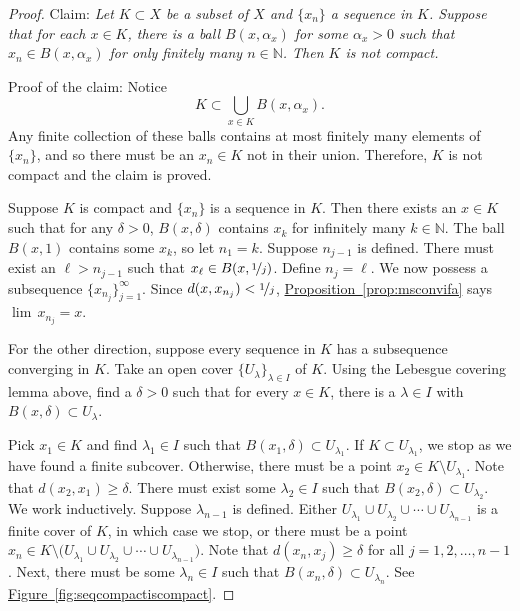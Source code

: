 \documentclass[12pt,openany]{book}
\newcommand{\N}{{\mathbb{N}}}
\theoremstyle{plain}
\theoremstyle{remark}
\theoremstyle{definition}
\theoremstyle{exercise}
\theoremstyle{example}
\newcommand{\figureref}[1]{\hyperref[#1]{Figure~\ref*{#1}}}
\newcommand{\propref}[1]{\hyperref[#1]{Proposition~\ref*{#1}}}
\begin{document}
\begin{proof}
Claim: \emph{Let $K \subset X$ be a subset of $X$ and
$\{ x_n \}$ a sequence in $K$.  Suppose that for each $x \in K$,
there is a ball $B(x,\alpha_x)$ for some $\alpha_x > 0$ such that
$x_n \in B(x,\alpha_x)$ for only finitely many $n \in \N$.
Then $K$ is not compact.}

Proof of the claim:
Notice
\begin{equation*}
K \subset \bigcup_{x \in K} B(x,\alpha_x) .
\end{equation*}
Any finite collection of these balls contains at most finitely many
elements of $\{ x_n \}$,
and so there must be an $x_n \in K$
not in their union.  Therefore, $K$ is not compact and the claim is
proved.

Suppose $K$ is compact and $\{ x_n \}$ is a sequence in $K$.
Then there exists an $x \in K$ such that
for any $\delta > 0$,
$B(x,\delta)$ contains $x_k$ for infinitely many $k \in \N$.
The ball $B(x,1)$ contains some $x_k$, so let $n_1 = k$.
Suppose $n_{j-1}$ is defined.
There must exist an $\ell > n_{j-1}$
such that $x_\ell \in B(x,\nicefrac{1}{j})$.  Define
$n_j = \ell$.
We now possess a subsequence $\{ x_{n_j} \}_{j=1}^\infty$.
Since
$d(x,x_{n_j}) < \nicefrac{1}{j}$,  \propref{prop:msconvifa} says
$\lim\, x_{n_j} = x$.

For the other direction, suppose every sequence in $K$
has a 
subsequence converging in $K$.
Take
an open cover $\{ U_\lambda \}_{\lambda \in I}$ of $K$.
Using the Lebesgue covering lemma above, find a $\delta > 0$
such that for every $x \in K$, there is a $\lambda \in I$ with
$B(x,\delta) \subset U_\lambda$.

Pick $x_1 \in K$ and find $\lambda_1 \in I$ such that $B(x_1,\delta) \subset
U_{\lambda_1}$.
If $K \subset U_{\lambda_1}$, we stop as we have found a
finite subcover.
Otherwise, there must be
a point $x_2 \in K \setminus U_{\lambda_1}$.
Note that $d(x_2,x_1) \geq \delta$.
There must exist some $\lambda_2 \in I$ such that
$B(x_2,\delta) \subset U_{\lambda_2}$.
We work inductively.  Suppose $\lambda_{n-1}$ is defined.
Either
$U_{\lambda_1} \cup
U_{\lambda_2} \cup \cdots \cup
U_{\lambda_{n-1}}$ is a finite cover of $K$, in which case we
stop, or
there must be 
a point $x_n \in K \setminus \bigl( U_{\lambda_1} \cup
U_{\lambda_2} \cup \cdots \cup
U_{\lambda_{n-1}}\bigr)$.
Note that $d(x_n,x_j) \geq \delta$ for all $j = 1,2,\ldots,n-1$.
Next, there must be some $\lambda_n \in I$
such that $B(x_n,\delta) \subset U_{\lambda_n}$.
See \figureref{fig:seqcompactiscompact}.


\end{proof}
\end{document}

